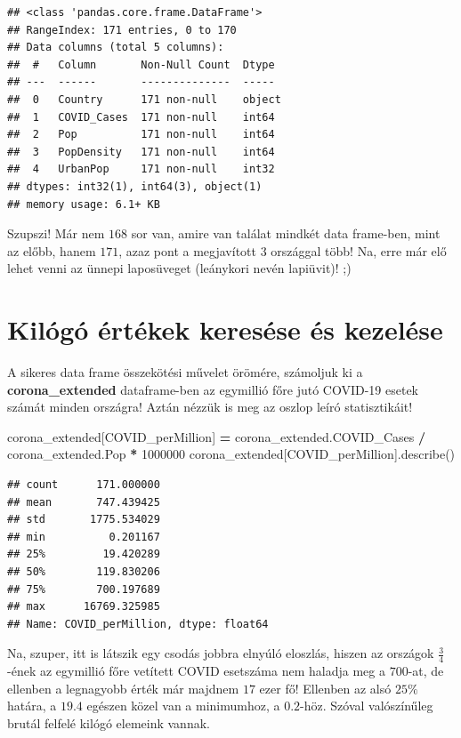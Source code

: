\documentclass[
]{book}
\newenvironment{Shaded}{\begin{snugshade}}{\end{snugshade}}
\newcommand{\DecValTok}[1]{\textcolor[rgb]{0.00,0.00,0.81}{#1}}
\newcommand{\NormalTok}[1]{#1}
\newcommand{\OperatorTok}[1]{\textcolor[rgb]{0.81,0.36,0.00}{\textbf{#1}}}
\newcommand{\StringTok}[1]{\textcolor[rgb]{0.31,0.60,0.02}{#1}}
\begin{document}
\begin{verbatim}
## <class 'pandas.core.frame.DataFrame'>
## RangeIndex: 171 entries, 0 to 170
## Data columns (total 5 columns):
##  #   Column       Non-Null Count  Dtype 
## ---  ------       --------------  ----- 
##  0   Country      171 non-null    object
##  1   COVID_Cases  171 non-null    int64 
##  2   Pop          171 non-null    int64 
##  3   PopDensity   171 non-null    int64 
##  4   UrbanPop     171 non-null    int32 
## dtypes: int32(1), int64(3), object(1)
## memory usage: 6.1+ KB
\end{verbatim}

Szupszi! Már nem \(168\) sor van, amire van találat mindkét data frame-ben, mint az előbb, hanem \(171\), azaz pont a megjavított \(3\) országgal több! Na, erre már elő lehet venni az ünnepi laposüveget (leánykori nevén lapiüvit)! ;)

\section{Kilógó értékek keresése és kezelése}\label{kiluxf3guxf3-uxe9rtuxe9kek-keresuxe9se-uxe9s-kezeluxe9se}

A sikeres data frame összekötési művelet örömére, számoljuk ki a \textbf{corona\_extended} dataframe-ben az egymillió főre jutó COVID-19 esetek számát minden országra! Aztán nézzük is meg az oszlop leíró statisztikáit!

\begin{Shaded}
\begin{Highlighting}[]
\NormalTok{corona\_extended[}\StringTok{\textquotesingle{}COVID\_perMillion\textquotesingle{}}\NormalTok{] }\OperatorTok{=}\NormalTok{ corona\_extended.COVID\_Cases }\OperatorTok{/}\NormalTok{ corona\_extended.Pop }\OperatorTok{*} \DecValTok{1000000}
\NormalTok{corona\_extended[}\StringTok{\textquotesingle{}COVID\_perMillion\textquotesingle{}}\NormalTok{].describe()}
\end{Highlighting}
\end{Shaded}

\begin{verbatim}
## count      171.000000
## mean       747.439425
## std       1775.534029
## min          0.201167
## 25%         19.420289
## 50%        119.830206
## 75%        700.197689
## max      16769.325985
## Name: COVID_perMillion, dtype: float64
\end{verbatim}

Na, szuper, itt is látszik egy csodás jobbra elnyúló eloszlás, hiszen az országok \(\frac{3}{4}\)-ének az egymillió főre vetített COVID esetszáma nem haladja meg a \(700\)-at, de ellenben a legnagyobb érték már majdnem \(17\) ezer fő! Ellenben az alsó \(25\%\) határa, a \(19.4\) egészen közel van a minimumhoz, a \(0.2\)-höz. Szóval valószínűleg brutál felfelé kilógó elemeink vannak.
\end{document}
